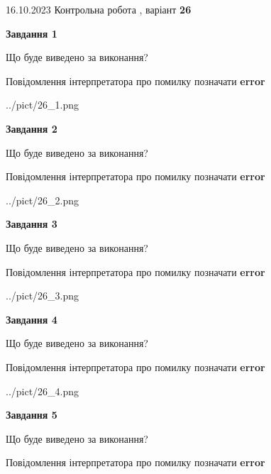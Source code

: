 \documentclass[12pt, ukrainian]{article}
\begin{document}
{\Large{16.10.2023 Контрольна робота , варіант  \No \textbf { 26 }\par}}
{
\begin {large}
{\begin {center}\textbf{Завдання 1}\end {center}}\par
Що буде виведено за виконання? \par
Повідомлення інтерпретатора про помилку позначати \textbf{error}

\begin{center}
	{../pict/26_1.png}
\end{center}
\newpage

{\begin {center}\textbf{Завдання 2}\end {center}}\par
Що буде виведено за виконання? \par
Повідомлення інтерпретатора про помилку позначати \textbf{error}

\begin{center}
	{../pict/26_2.png}
\end{center}
\newpage

{\begin {center}\textbf{Завдання 3}\end {center}}\par
Що буде виведено за виконання? \par
Повідомлення інтерпретатора про помилку позначати \textbf{error}

\begin{center}
	{../pict/26_3.png}
\end{center}
\newpage

{\begin {center}\textbf{Завдання 4}\end {center}}\par
Що буде виведено за виконання? \par
Повідомлення інтерпретатора про помилку позначати \textbf{error}

\begin{center}
	{../pict/26_4.png}
\end{center}
\newpage

{\begin {center}\textbf{Завдання 5}\end {center}}\par
Що буде виведено за виконання? \par
Повідомлення інтерпретатора про помилку позначати \textbf{error}


\end{large}}
\end{document}
